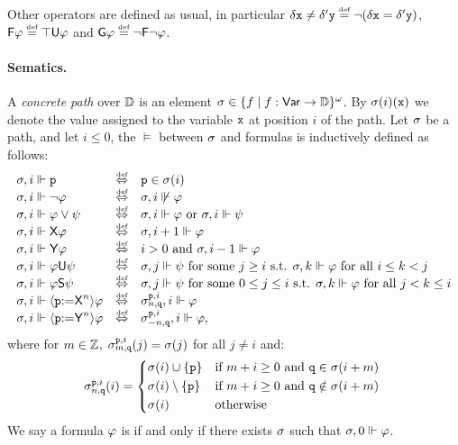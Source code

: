  Other operators are defined as usual, in particular $\delta\avar \neq \delta'\avarbis\egdef \neg(\delta\avar = \delta'\avarbis)$, $\Eventually\aformula \egdef \top\Until\aformula$ and $\Always\aformula \egdef \neg\Eventually\neg\aformula$. 


\paragraph{Sematics.} A \emph{concrete path} over $\mathbb{D}$ is an element $\sigma\in\{f\mid f:{\rm \sf Var}\to\mathbb{D}\}^\omega$. By $\sigma(i)(\mathtt{x})$ we denote the value assigned to the variable $\mathtt{x}$ at position $i$ of the path.
Let $\sigma$ be a path, and let $i\leq 0$, the  $\models$ between $\sigma$ and formulas is inductively defined as follows:
\[
\begin{array}{lcl}
\apath,i \models \avarprop & \iffdef & \avarprop\in\apath(i) \\
\apath,i \models \neg\aformula & \iffdef & \apath,i \not\models\aformula \\
\apath,i \models \aformula\vee\aformulabis & \iffdef & \apath,i \models \aformula \mbox{ or } \apath,i \models \aformulabis \\
\apath,i \models \Next\aformula & \iffdef & \apath,i+1 \models \aformula \\ 
\apath,i \models \Prev\aformula & \iffdef & i>0 \mbox{ and } \apath,i-1 \models \aformula \\
\apath,i \models \aformula\Until\aformulabis & \iffdef & \apath,j \models \aformulabis \mbox{ for some } j\geq i \mbox{ s.t. } \apath,k \models \aformula \mbox{ for all } i\leq k < j \\
\apath,i \models \aformula\Since\aformulabis & \iffdef & \apath,j \models \aformulabis \mbox{ for some } 0\leq j \leq i \mbox{ s.t. } \apath,k \models \aformula \mbox{ for all } j< k \leq i \\
\apath,i \models \Assign{\avarprop}{\Nextn}\aformula & \iffdef & \apath^{\avarprop,i}_{n,\avarpropbis},i \models \aformula \\ 
\apath,i \models \Assign{\avarprop}{\Prevn}\aformula & \iffdef & \apath^{\avarprop,i}_{{-}n,\avarpropbis},i \models \aformula,
\end{array}
\]
where for $m\in\mathbb{Z}$, $\sigma^{\mathtt{p},i}_{m,\mathtt{q}}(j)=\sigma(j)$ for all $j\neq i$ and:
\begin{equation*}
    \apath^{\avarprop,i}_{n,\avarpropbis}(i) =
    \begin{cases*}
      \apath(i)\cup\{\avarprop\} & if $m+i \geq 0$ and $\avarpropbis\in\apath(i+m)$ \\
      \apath(i)\setminus\{\avarprop\} & if $m+i \geq 0$ and $\avarpropbis\notin\apath(i+m)$ \\ 
      \apath(i)        & otherwise
    \end{cases*}
\end{equation*}
We say a formula $\varphi$ is  if and only if there exists $\sigma$ such that $\sigma,0\Vdash\varphi$.




